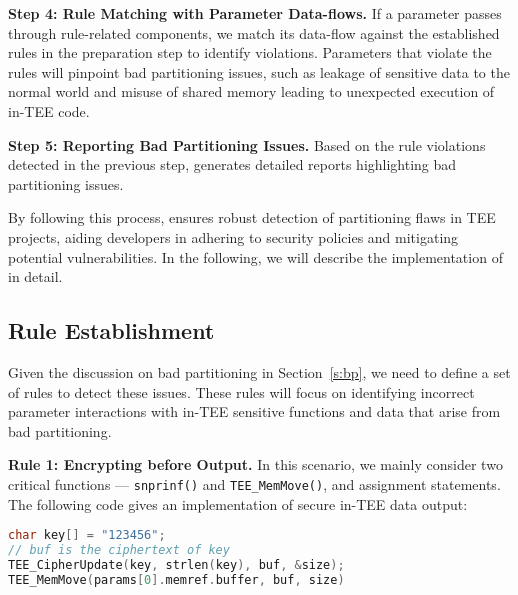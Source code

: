 \textbf{Step 4: Rule Matching with Parameter Data-flows.} If a parameter passes through rule-related components, we match its data-flow against the established rules in the preparation step to identify violations. Parameters that violate the rules will pinpoint bad partitioning issues, such as leakage of sensitive data to the normal world and misuse of shared memory leading to unexpected execution of in-TEE code.

\textbf{Step 5: Reporting Bad Partitioning Issues.} Based on the rule violations detected in the previous step, \ccSysName generates detailed reports highlighting bad partitioning issues.

By following this process, \ccSysName ensures robust detection of partitioning flaws in TEE projects, aiding developers in adhering to security policies and mitigating potential vulnerabilities. In the following, we will describe the implementation of \ccSysName in detail.

\subsection{Rule Establishment} \label{s:rules}
Given the discussion on bad partitioning in Section~\ref{s:bp}, we need to define a set of rules to detect these issues. These rules will focus on identifying incorrect parameter interactions with in-TEE sensitive functions and data that arise from bad partitioning.

\textbf{Rule 1: Encrypting before Output.} In this scenario, we mainly consider two critical functions --- \texttt{snprinf()} and \texttt{TEE\_MemMove()}, and assignment statements. The following code gives an implementation of secure in-TEE data output:
\begin{lstlisting}[language=c++, aboveskip=10pt, belowskip=5pt]
char key[] = "123456";
// buf is the ciphertext of key
TEE_CipherUpdate(key, strlen(key), buf, &size);
TEE_MemMove(params[0].memref.buffer, buf, size)
\end{lstlisting}

